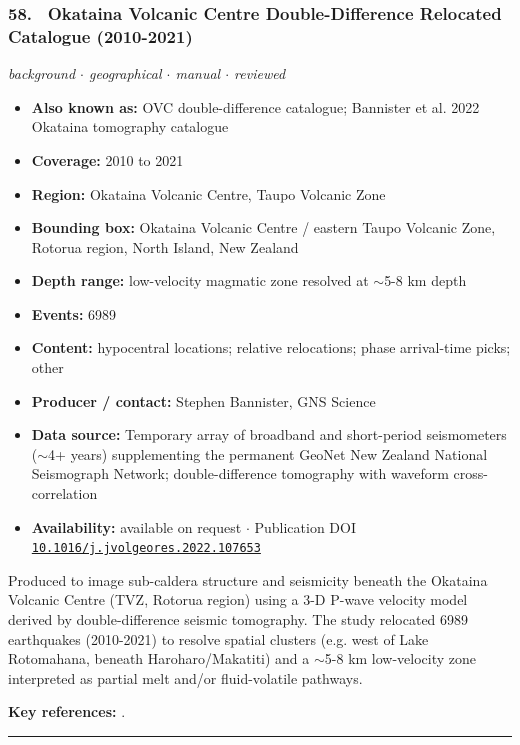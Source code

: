 \documentclass[10pt,a4paper]{article}
\newcommand{\catentryrule}{\par\vspace{3pt}\noindent\textcolor{rulegrey}{\rule{\linewidth}{0.3pt}}\par\vspace{5pt}}
\newcommand{\kv}[2]{\item \textbf{#1:} #2}
\begin{document}
\subsubsection*{\hypertarget{c:58}{58.}~ Okataina Volcanic Centre Double-Difference Relocated Catalogue (2010-2021)}
{\small\itshape background $\cdot$ geographical $\cdot$ manual $\cdot$ reviewed}\par\vspace{2pt}
\begin{itemize}[leftmargin=1.3em,itemsep=0.6pt,topsep=1pt,parsep=0pt]
\kv{Also known as}{OVC double-difference catalogue; Bannister et al. 2022 Okataina tomography catalogue}
\kv{Coverage}{2010 to 2021}
\kv{Region}{Okataina Volcanic Centre, Taupo Volcanic Zone}
\kv{Bounding box}{Okataina Volcanic Centre / eastern Taupo Volcanic Zone, Rotorua region, North Island, New Zealand}
\kv{Depth range}{low-velocity magmatic zone resolved at $\sim$5-8 km depth}
\kv{Events}{6989}
\kv{Content}{hypocentral locations; relative relocations; phase arrival-time picks; other}
\kv{Producer / contact}{Stephen Bannister, GNS Science}
\kv{Data source}{Temporary array of broadband and short-period seismometers ($\sim$4+ years) supplementing the permanent GeoNet New Zealand National Seismograph Network; double-difference tomography with waveform cross-correlation}
\kv{Availability}{available on request $\cdot$ Publication DOI \href{https://doi.org/10.1016/j.jvolgeores.2022.107653}{\nolinkurl{10.1016/j.jvolgeores.2022.107653}}}
\end{itemize}
\par\vspace{2pt}Produced to image sub-caldera structure and seismicity beneath the Okataina Volcanic Centre (TVZ, Rotorua region) using a 3-D P-wave velocity model derived by double-difference seismic tomography. The study relocated 6989 earthquakes (2010-2021) to resolve spatial clusters (e.g. west of Lake Rotomahana, beneath Haroharo/Makatiti) and a $\sim$5-8 km low-velocity zone interpreted as partial melt and/or fluid-volatile pathways.
\par\vspace{2pt}\textbf{Key references:} \cite{Bannister2022}.
\catentryrule
\end{document}
